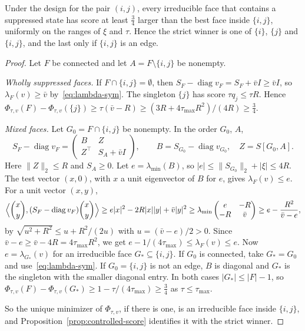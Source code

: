 \begin{lemma}\label{lem:suppression}
Under the design for the pair $(i,j)$, every irreducible face that contains a suppressed state
has score at least $\frac34$ larger than the best face inside $\{i,j\}$, uniformly on the ranges
of $\xi$ and $\tau$. Hence the strict winner is one of $\{i\}$, $\{j\}$ and $\{i,j\}$, and the last
only if $\{i,j\}$ is an edge.
\end{lemma}

\begin{proof}
Let $F$ be connected and let $A=F\setminus\{i,j\}$ be nonempty.

\emph{Wholly suppressed faces.} If $F\cap\{i,j\}=\emptyset$, then
$S_F-\operatorname{diag}v_F=S_F+\bar vI\ge\bar vI$, so $\lambda_F(v)\ge\bar v$
by~\eqref{eq:lambda-sym}. The singleton $\{j\}$ has score $\tau q_j\le\tau R$. Hence
$\Phi_{\tau,v}(F)-\Phi_{\tau,v}(\{j\})\ge\tau(\bar v-R)\ge(3R+4\tau_{\max}R^2)/(4R)\ge\frac34$.

\emph{Mixed faces.} Let $G_0=F\cap\{i,j\}$ be nonempty. In the order $G_0$, $A$,
\[
 S_F-\operatorname{diag}v_F=\begin{pmatrix}B&Z\\Z^\top&S_A+\bar vI\end{pmatrix},\qquad
 B=S_{G_0}-\operatorname{diag}v_{G_0},\quad Z=S[G_0,A].
\]
Here $\|Z\|_2\le R$ and $S_A\ge0$. Let $e=\lambda_{\min}(B)$, so
$|e|\le\|S_{G_0}\|_2+|\xi|\le4R$. The test vector $(x,0)$, with $x$ a unit eigenvector of $B$
for $e$, gives $\lambda_F(v)\le e$. For a unit vector $(x,y)$,
\[
 \Bigl\langle\binom xy,(S_F-\operatorname{diag}v_F)\binom xy\Bigr\rangle
 \ge e|x|^2-2R|x||y|+\bar v|y|^2\ge\lambda_{\min}\begin{pmatrix}e&-R\\-R&\bar v\end{pmatrix}
 \ge e-\frac{R^2}{\bar v-e},
\]
by $\sqrt{u^2+R^2}\le u+R^2/(2u)$ with $u=(\bar v-e)/2>0$. Since $\bar v-e\ge\bar v-4R=4\tau_{\max}R^2$,
we get $e-1/(4\tau_{\max})\le\lambda_F(v)\le e$. Now $e=\lambda_{G_*}(v)$ for an irreducible face
$G_*\subseteq\{i,j\}$. If $G_0$ is connected, take $G_*=G_0$ and use~\eqref{eq:lambda-sym}. If
$G_0=\{i,j\}$ is not an edge, $B$ is diagonal and $G_*$ is the singleton with the smaller
diagonal entry. In both cases $|G_*|\le|F|-1$, so
$\Phi_{\tau,v}(F)-\Phi_{\tau,v}(G_*)\ge1-\tau/(4\tau_{\max})\ge\frac34$ as $\tau\le \tau_{\max}$.

So the unique minimizer of $\Phi_{\tau,v}$, if there is one, is an irreducible face inside
$\{i,j\}$, and Proposition~\ref{prop:controlled-score} identifies it with the strict winner.
\end{proof}

